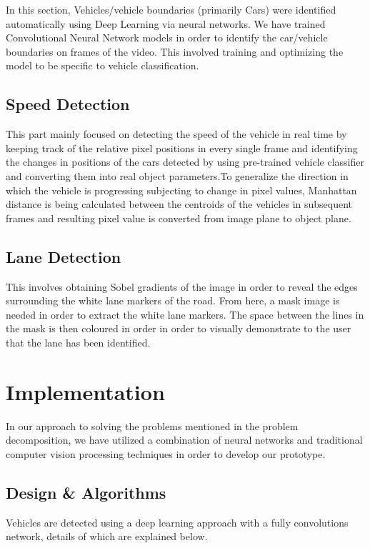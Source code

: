 \documentclass[conference]{IEEEtran}
\begin{document}
In this section, Vehicles/vehicle boundaries (primarily Cars) were identified automatically using Deep Learning via neural networks. We have trained Convolutional Neural Network models in order to identify the car/vehicle boundaries on frames of the video. This involved training and optimizing the model to be specific to vehicle classification. 

\subsection{Speed Detection}\label{B}

This part mainly focused on detecting the speed of the vehicle in real time by keeping track of the relative pixel positions in every single frame and identifying the changes in positions of the cars detected by using pre-trained vehicle classifier and converting them into real object parameters.To generalize the direction in which the vehicle is progressing subjecting to change in pixel values, Manhattan distance is being calculated between the centroids of the vehicles in subsequent frames and resulting pixel value is converted from image plane to object plane.

\subsection{Lane Detection}\label{C}

This involves obtaining Sobel gradients of the image in order to reveal the edges surrounding the white lane markers of the road. From here, a mask image is needed in order to extract the white lane markers. The space between the lines in the mask is then coloured in order in order to visually demonstrate to the user that the lane has been identified. 

\section{Implementation}

In our approach to solving the problems mentioned in the problem decomposition, we have utilized a combination of neural networks and traditional computer vision processing techniques in order to develop our prototype.

\subsection{Design \& Algorithms}

Vehicles are detected using a deep learning approach with a fully convolutions network, details of which are explained below.  \\
\end{document}
